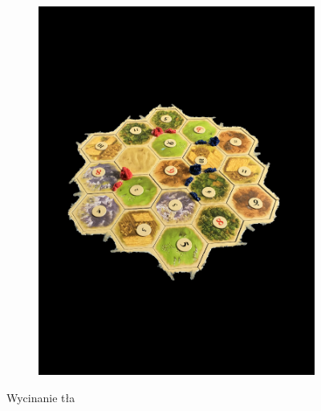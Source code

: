 \documentclass[a4paper]{article}
\begin{document}
\begin{figure}[H]
\begin{subfigure}[t]{0.3\linewidth}
            \includegraphics[width=\linewidth]{pictures/steps/background_cut.png}
        \end{subfigure}
        \caption{Wycinanie tła}
        \label{fig:step1b}
    \end{figure}
\end{document}
